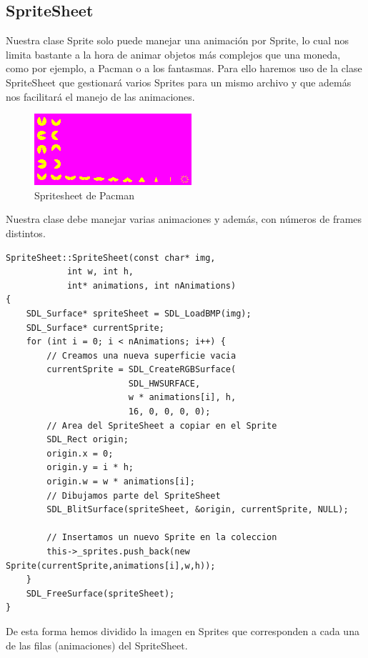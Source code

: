 \documentclass[parskip=half*]{scrartcl}
\begin{document}
	\subsection{SpriteSheet}
		Nuestra clase Sprite solo puede manejar una animaci\'on por Sprite, lo cual nos limita bastante a la hora de animar objetos m\'as complejos que una moneda, como por ejemplo, a Pacman o a los fantasmas. Para ello haremos uso de la clase SpriteSheet que gestionar\'a varios Sprites para un mismo archivo y que adem\'as nos facilitar\'a el manejo de las animaciones.

		\begin{figure}
			\centering
			\includegraphics{pacman_example.png}
			\caption{Spritesheet de Pacman}
		\end{figure}

		Nuestra clase debe manejar varias animaciones y adem\'as, con n\'umeros de frames distintos.

		\begin{verbatim}
SpriteSheet::SpriteSheet(const char* img,
			int w, int h,
			int* animations, int nAnimations)
{  
    SDL_Surface* spriteSheet = SDL_LoadBMP(img);    
    SDL_Surface* currentSprite;
    for (int i = 0; i < nAnimations; i++) {
        // Creamos una nueva superficie vacia
        currentSprite = SDL_CreateRGBSurface(
        				SDL_HWSURFACE,
        				w * animations[i], h,
        				16, 0, 0, 0, 0);        
        // Area del SpriteSheet a copiar en el Sprite
        SDL_Rect origin;
        origin.x = 0;
        origin.y = i * h;
        origin.w = w * animations[i];   
        // Dibujamos parte del SpriteSheet
        SDL_BlitSurface(spriteSheet, &origin, currentSprite, NULL);

        // Insertamos un nuevo Sprite en la coleccion
        this->_sprites.push_back(new Sprite(currentSprite,animations[i],w,h));
    }
    SDL_FreeSurface(spriteSheet);    
}
		\end{verbatim}

		De esta forma hemos dividido la imagen en Sprites que corresponden a cada una de las filas (animaciones) del SpriteSheet.
\end{document}
